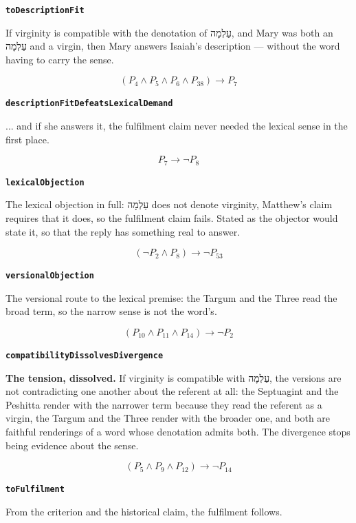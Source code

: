 \documentclass[11pt]{article}
\begin{document}
\par\medskip\noindent\textbf{\texttt{to\allowbreak{}Description\allowbreak{}Fit}}\par\nobreak\noindent
If virginity is compatible with the denotation of עַלְמָה, and Mary was both an עַלְמָה and a virgin, then Mary answers Isaiah's description — without the word having to carry the sense.

\[(P_{4} \land P_{5} \land P_{6} \land P_{38}) \rightarrow P_{7}\]
\par\medskip\noindent\textbf{\texttt{description\allowbreak{}Fit\allowbreak{}Defeats\allowbreak{}Lexical\allowbreak{}Demand}}\par\nobreak\noindent
... and if she answers it, the fulfilment claim never needed the lexical sense in the first place.

\[P_{7} \rightarrow \lnot P_{8}\]
\par\medskip\noindent\textbf{\texttt{lexical\allowbreak{}Objection}}\par\nobreak\noindent
The lexical objection in full: עַלְמָה does not denote virginity, Matthew's claim requires that it does, so the fulfilment claim fails. Stated as the objector would state it, so that the reply has something real to answer.

\[(\lnot P_{2} \land P_{8}) \rightarrow \lnot P_{53}\]
\par\medskip\noindent\textbf{\texttt{versional\allowbreak{}Objection}}\par\nobreak\noindent
The versional route to the lexical premise: the Targum and the Three read the broad term, so the narrow sense is not the word's.

\[(P_{10} \land P_{11} \land P_{14}) \rightarrow \lnot P_{2}\]
\par\medskip\noindent\textbf{\texttt{compatibility\allowbreak{}Dissolves\allowbreak{}Divergence}}\par\nobreak\noindent
\textbf{The tension, dissolved.} If virginity is compatible with עַלְמָה, the versions are not contradicting one another about the referent at all: the Septuagint and the Peshitta render with the narrower term because they read the referent as a virgin, the Targum and the Three render with the broader one, and both are faithful renderings of a word whose denotation admits both. The divergence stops being evidence about the sense.

\[(P_{5} \land P_{9} \land P_{12}) \rightarrow \lnot P_{14}\]
\par\medskip\noindent\textbf{\texttt{to\allowbreak{}Fulfilment}}\par\nobreak\noindent
From the criterion and the historical claim, the fulfilment follows.
\end{document}
